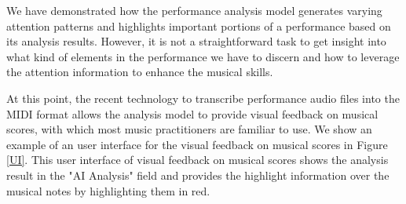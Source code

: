 \documentclass[sigconf,review,anonymous]{acmart}
\begin{document}
{%
We have demonstrated how the performance analysis model generates varying attention patterns and highlights important portions of a performance based on its analysis results. 
However, it is not a straightforward task to get insight into what kind of elements in the performance we have to discern and how to leverage the attention information to enhance the musical skills.

At this point, the recent technology to transcribe performance audio files into the MIDI format \cite{hawthorne2021, gardner2022} allows the analysis model to provide visual feedback on musical scores, with which most music practitioners are familiar to use.
We show an example of an user interface for the visual feedback on musical scores in Figure \ref{UI}.
This user interface of visual feedback on musical scores shows the analysis result in the "AI Analysis" field and provides the highlight information over the musical notes by highlighting them in red.

}
\end{document}
